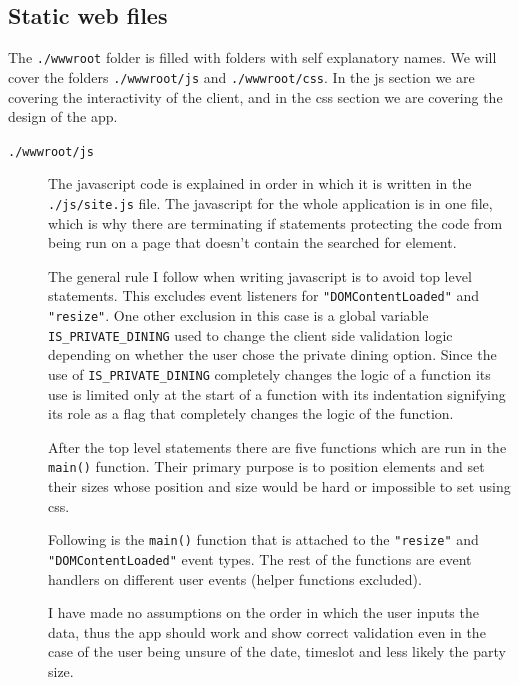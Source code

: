 \documentclass[12pt, a4paper]{article}
\begin{document}
\subsection{Static web files}
The \texttt{./wwwroot} folder is filled with folders with self explanatory names. We will cover the folders \texttt{./wwwroot/js} and \texttt{./wwwroot/css}. In the js section we are covering the interactivity of the client, and in the css section we are covering the design of the app.
\begin{description}
    \item[\texttt{./wwwroot/js}] The javascript code is explained in order in which it is written in the \texttt{./js/site.js} file. 
    The javascript for the whole application is in one file, which is why there are terminating if statements protecting the code from being run on a page that doesn't contain the searched for element.

    The general rule I follow when writing javascript is to avoid top level statements. This excludes event listeners for \texttt{"DOMContentLoaded"} and \texttt{"resize"}. One other exclusion in this case is a global variable \texttt{IS\_PRIVATE\_DINING} used to change the client side validation logic depending on whether the user chose the private dining option. Since the use of \texttt{IS\_PRIVATE\_DINING} completely changes the logic of a function its use is limited only at the start of a function with its indentation signifying its role as a flag that completely changes the logic of the function.
    
    After the top level statements there are five functions which are run in the \texttt{main()} function. Their primary purpose is to position elements and set their sizes whose position and size would be hard or impossible to set using css. 

    Following is the \texttt{main()} function that is attached to the \texttt{"resize"} and \texttt{"DOMContentLoaded"} event types. The rest of the functions are event handlers on different user events (helper functions excluded). 

    I have made no assumptions on the order in which the user inputs the data, thus the app should work and show correct validation even in the case of the user being unsure of the date, timeslot and less likely the party size.


\end{description}
\end{document}
